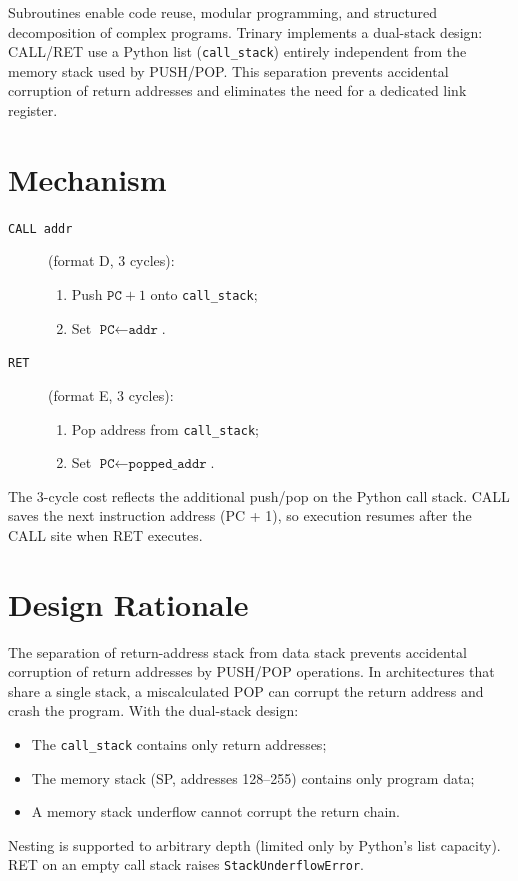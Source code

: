 \documentclass[10pt,a4paper,twoside]{book}
\begin{document}
Subroutines enable code reuse, modular programming, and structured decomposition of
complex programs. Trinary implements a dual-stack design: CALL/RET use a Python list
(\texttt{call\_stack}) entirely independent from the memory stack used by PUSH/POP.
This separation prevents accidental corruption of return addresses and eliminates the
need for a dedicated link register.

\section{Mechanism}

\begin{description}
    \item[\texttt{CALL addr}] (format D, 3 cycles):
          \begin{enumerate}
              \item Push $\texttt{PC} + 1$ onto \texttt{call\_stack};
              \item Set $\texttt{PC} \gets \texttt{addr}$.
          \end{enumerate}
    \item[\texttt{RET}] (format E, 3 cycles):
          \begin{enumerate}
              \item Pop address from \texttt{call\_stack};
              \item Set $\texttt{PC} \gets \texttt{popped\_addr}$.
          \end{enumerate}
\end{description}

The 3-cycle cost reflects the additional push/pop on the Python call stack. CALL
saves the next instruction address (PC + 1), so execution resumes after the CALL
site when RET executes.

\section{Design Rationale}

The separation of return-address stack from data stack prevents accidental corruption
of return addresses by PUSH/POP operations. In architectures that share a single
stack, a miscalculated POP can corrupt the return address and crash the program.
With the dual-stack design:
\begin{itemize}
    \item The \texttt{call\_stack} contains only return addresses;
    \item The memory stack (SP, addresses 128--255) contains only program data;
    \item A memory stack underflow cannot corrupt the return chain.
\end{itemize}
Nesting is supported to arbitrary depth (limited only by Python's list capacity).
RET on an empty call stack raises \texttt{StackUnderflowError}.
\end{document}
